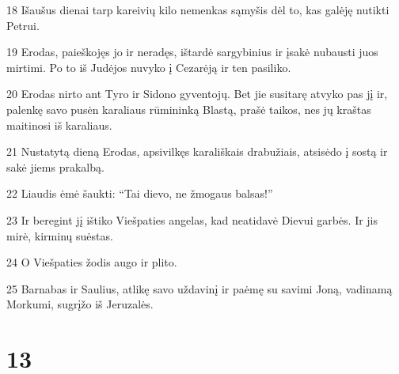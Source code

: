 \par 18 Išaušus dienai tarp kareivių kilo nemenkas sąmyšis dėl to, kas galėję nutikti Petrui. 
\par 19 Erodas, paieškojęs jo ir neradęs, ištardė sargybinius ir įsakė nubausti juos mirtimi. Po to iš Judėjos nuvyko į Cezarėją ir ten pasiliko. 
\par 20 Erodas nirto ant Tyro ir Sidono gyventojų. Bet jie susitarę atvyko pas jį ir, palenkę savo pusėn karaliaus rūmininką Blastą, prašė taikos, nes jų kraštas maitinosi iš karaliaus. 
\par 21 Nustatytą dieną Erodas, apsivilkęs karališkais drabužiais, atsisėdo į sostą ir sakė jiems prakalbą. 
\par 22 Liaudis ėmė šaukti: “Tai dievo, ne žmogaus balsas!” 
\par 23 Ir beregint jį ištiko Viešpaties angelas, kad neatidavė Dievui garbės. Ir jis mirė, kirminų suėstas. 
\par 24 O Viešpaties žodis augo ir plito. 
\par 25 Barnabas ir Saulius, atlikę savo uždavinį ir paėmę su savimi Joną, vadinamą Morkumi, sugrįžo iš Jeruzalės.


\chapter{13}


